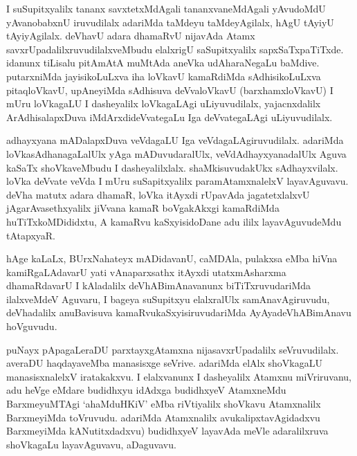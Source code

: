 
\begin{artha}
I suSupitxyalilx tananx savxtetxMdAgali tananxvaneMdAgali yAvudoMdU yAvanobabxnU iruvudilalx adariMda taMdeyu taMdeyAgilalx, hAgU tAyiyU tAyiyAgilalx. deVhavU adara dhamaRvU nijavAda Atamx savxrUpadalilxruvudilalxveMbudu elalxrigU saSupitxyalilx sapxSaTxpaTiTxde. idanunx tiLisalu pitAmAtA muMtAda aneVka udAharaNegaLu baMdive. putarxniMda jayisikoLuLxva iha loVkavU kamaRdiMda sAdhisikoLuLxva pitaqloVkavU, upAneyiMda sAdhisuva deVvaloVkavU (barxhamxloVkavU) I mUru loVkagaLU I dasheyalilx loVkagaLAgi uLiyuvudilalx, yajacnxdalilx ArAdhisalapxDuva iMdArxdideVvategaLu Iga deVvategaLAgi uLiyuvudilalx. 
\end{artha}

\begin{artha}%
adhayxyana mADalapxDuva veVdagaLU Iga veVdagaLAgiruvudilalx. adariMda loVkasAdhanagaLalUlx yAga mADuvudaralUlx, veVdAdhayxyanadalUlx Aguva kaSaTx shoVkaveMbudu I dasheyalilxlalx. shaMkisuvudakUkx sAdhayxvilalx. loVka deVvate veVda I mUru suSapitxyalilx paramAtamxnalelxV layavAguvavu. deVha matutx adara dhamaR, loVka itAyxdi rUpavAda jagatetxlalxvU jAgarAvasethxyalilx jiVvana kamaR boVgakAkxgi kamaRdiMda huTiTxkoMDididxtu, A kamaRvu kaSxyisidoDane adu ililx layavAguvudeMdu tAtapxyaR. 
\end{artha}


\begin{artha}
hAge kaLaLx, BUrxNahateyx mADidavanU, caMDAla, pulakxsa eMba hiVna kamiRgaLAdavarU yati vAnaparxsathx itAyxdi utatxmAsharxma dhamaRdavarU I kAladalilx deVhABimAnavanunx biTiTxruvudariMda ilalxveMdeV Aguvaru, I bageya suSupitxyu elalxralUlx samAnavAgiruvudu, deVhadalilx anuBavisuva kamaRvukaSxyisiruvudariMda AyAyadeVhABimAnavu hoVguvudu. 
\end{artha}


\begin{artha}
puNayx pApagaLeraDU parxtayxgAtamxna nijasavxrUpadalilx seVruvudilalx. averaDU haqdayaveMba manasisxge seVrive. adariMda elAlx shoVkagaLU manasisxnalelxV iratakakxvu. I elalxvanunx I dasheyalilx Atamxnu miVriruvanu, adu heVge eMdare budidhxyu idAdxga budidhxyeV AtamxneMdu BarxmeyuMTAgi `ahaMduHKiV' eMba riVtiyalilx shoVkavu Atamxnalilx BarxmeyiMda toVruvudu. adariMda Atamxnalilx avukalipxtavAgidadxvu BarxmeyiMda kANutitxdadxvu) budidhxyeV layavAda meVle adaralilxruva shoVkagaLu layavAguvavu, aDaguvavu. 
\end{artha}

